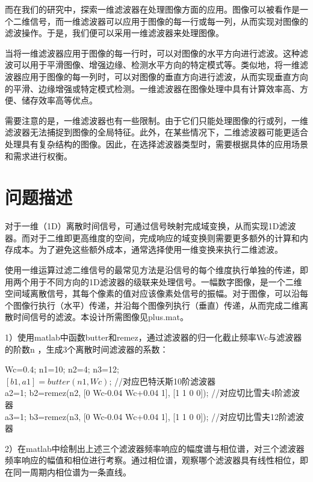 \documentclass{article}
\begin{document}
而在我们的研究中，探索一维滤波器在处理图像方面的应用。图像可以被看作是一个二维信号，而一维滤波器可以应用于图像的每一行或每一列，从而实现对图像的滤波操作。于是，我们便可以采用一维滤波器来处理图像。

当将一维滤波器应用于图像的每一行时，可以对图像的水平方向进行滤波。这种滤波可以用于平滑图像、增强边缘、检测水平方向的特定模式等。类似地，将一维滤波器应用于图像的每一列时，可以对图像的垂直方向进行滤波，从而实现垂直方向的平滑、边缘增强或特定模式检测。一维滤波器在图像处理中具有计算效率高、方便、储存效率高等优点。

需要注意的是，一维滤波器也有一些限制。由于它们只能处理图像的行或列，一维滤波器无法捕捉到图像的全局特征。此外，在某些情况下，二维滤波器可能更适合处理具有复杂结构的图像。因此，在选择滤波器类型时，需要根据具体的应用场景和需求进行权衡。






\section{问题描述}
对于一维（1D）离散时间信号，可通过信号映射完成域变换，从而实现1D滤波器。而对于二维即更高维度的空间，完成响应的域变换则需要更多额外的计算和内存成本。为了避免这些额外成本，通常选择使用一维变换来执行二维滤波。


使用一维运算过滤二维信号的最常见方法是沿信号的每个维度执行单独的传递，即用两个用于不同方向的1D滤波器的级联来处理信号。一幅数字图像，是一个二维空间域离散信号，其每个像素的值对应该像素处信号的振幅。对于图像，可以沿每个图像行执行（水平）传递，并沿每个图像列执行（垂直）传递，从而完成二维离散时间信号的滤波。本设计所需图像见plus.mat。

1）使用matlab中函数butter和remez，通过滤波器的归一化截止频率Wc与滤波器的阶数n ，生成3个离散时间滤波器的系数： 
\begin{center}
Wc=0.4; n1=10; n2=4; n3=12; \\
$\left[b1,a1\right]= butter(n1,Wc)$; //对应巴特沃斯10阶滤波器\\
a2=1; b2=remez(n2, [0 Wc-0.04 Wc+0.04 1], [1 1 0 0]); //对应切比雪夫4阶滤波器\\
a3=1; b3=remez(n3, [0 Wc-0.04 Wc+0.04 1], [1 1 0 0]); //对应切比雪夫12阶滤波器\\
\end{center}


2）在matlab中绘制出上述三个滤波器频率响应的幅度谱与相位谱，对三个滤波器频率响应的幅值和相位进行考察。通过相位谱，观察哪个滤波器具有线性相位，即在同一周期内相位谱为一条直线。
\end{document}
